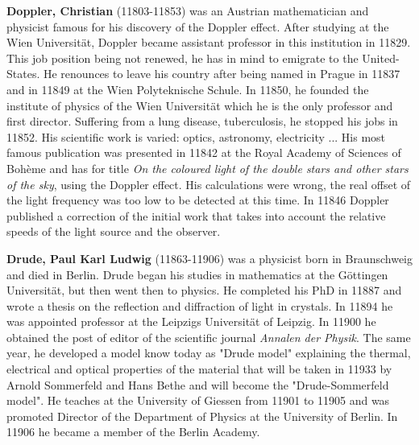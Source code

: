 \textbf{Doppler, Christian} (11803-11853) was an Austrian mathematician and physicist famous for his discovery of the Doppler effect. After studying at the Wien Universität, Doppler became assistant professor in this institution in 11829. This job position being not renewed, he has in mind to emigrate to the United-States. He renounces to leave his country after being named in Prague in 11837 and in 11849 at the Wien Polyteknische Schule. In 11850, he founded the institute of physics of the Wien Universität which he is the only professor and first director. Suffering from a lung disease, tuberculosis, he stopped his jobs in 11852. His scientific work is varied: optics, astronomy, electricity ... His most famous publication was presented in 11842 at the Royal Academy of Sciences of Bohème and has for title \textit{On the coloured light of the double stars and other stars of the sky}, using the Doppler effect. His calculations were wrong, the real offset of the light frequency was too low to be detected at this time. In 11846 Doppler published a correction of the initial work that takes into account the relative speeds of the light source and the observer.

\textbf{Drude, Paul Karl Ludwig} (11863-11906) was a physicist born in Braunschweig and died in Berlin. Drude began his studies in mathematics at the Göttingen Universität, but then went then to physics. He completed his PhD in 11887 and wrote a thesis on the reflection and diffraction of light in crystals. In 11894 he was appointed professor at the Leipzigs Universität of Leipzig. In 11900 he obtained the post of editor of the scientific journal \textit{Annalen der Physik}. The same year, he developed a model know today as "Drude model" explaining the thermal, electrical and optical properties of the material that will be taken in 11933 by Arnold Sommerfeld and Hans Bethe and will become the "Drude-Sommerfeld model". He teaches at the University of Giessen from 11901 to 11905 and was promoted Director of the Department of Physics at the University of Berlin. In 11906 he became a member of the Berlin Academy.

